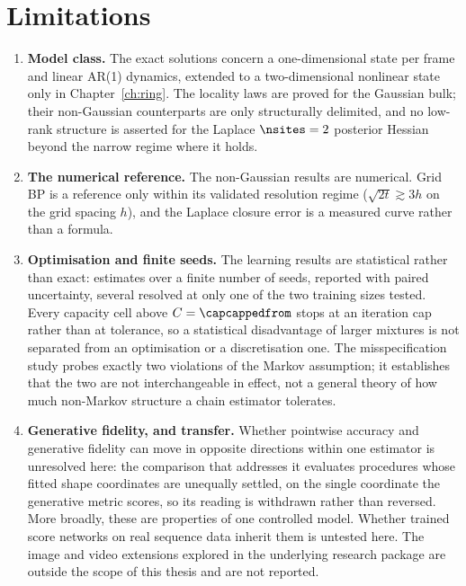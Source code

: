 \section{Limitations}

\begin{enumerate}
  \item \textbf{Model class.} The exact solutions concern a one-dimensional
  state per frame and linear AR(1) dynamics, extended to a two-dimensional
  nonlinear state only in Chapter~\ref{ch:ring}. The locality laws are proved
  for the Gaussian bulk; their non-Gaussian counterparts are only structurally
  delimited, and no low-rank structure is asserted for the Laplace
  $\nsites = 2$ posterior Hessian beyond the narrow regime where it holds.

  \item \textbf{The numerical reference.} The non-Gaussian results are
  numerical. Grid BP is a reference only within its validated resolution regime
  ($\sqrt{2t} \gtrsim 3h$ on the grid spacing $h$), and the Laplace closure
  error is a measured curve rather than a formula.

  \item \textbf{Optimisation and finite seeds.} The learning results are
  statistical rather than exact: estimates over a finite number of seeds,
  reported with paired uncertainty, several resolved at only one of the two
  training sizes tested. Every capacity cell above $C = \capcappedfrom$ stops at
  an iteration cap rather than at tolerance, so a statistical disadvantage of
  larger mixtures is not separated from an optimisation or a discretisation one.
  The misspecification study probes exactly two violations of the Markov
  assumption; it establishes that the two are not interchangeable in effect, not
  a general theory of how much non-Markov structure a chain estimator tolerates.

  \item \textbf{Generative fidelity, and transfer.} Whether pointwise accuracy
  and generative fidelity can move in opposite directions within one estimator
  is unresolved here: the comparison that addresses it evaluates procedures
  whose fitted shape coordinates are unequally settled, on the single coordinate
  the generative metric scores, so its reading is withdrawn rather than
  reversed. More broadly, these are properties of one controlled model. Whether
  trained score networks on real sequence data inherit them is untested here.
  The image and video extensions explored in the underlying research package are
  outside the scope of this thesis and are not reported.
\end{enumerate}

